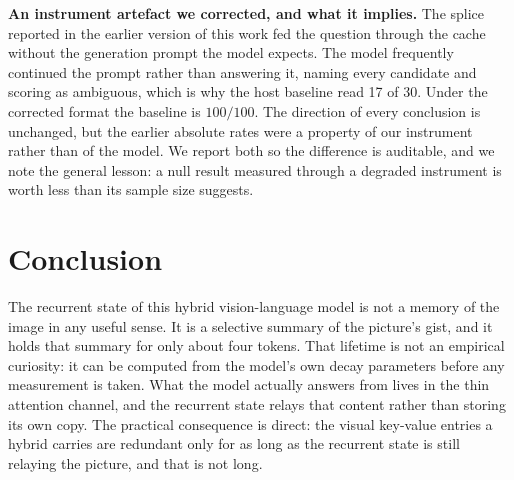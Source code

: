 \documentclass[10pt]{article}
\begin{document}
\textbf{An instrument artefact we corrected, and what it implies.} The splice
reported in the earlier version of this work fed the question through the cache
without the generation prompt the model expects. The model frequently continued
the prompt rather than answering it, naming every candidate and scoring as
ambiguous, which is why the host baseline read 17 of 30. Under the corrected
format the baseline is $100/100$. The direction of every conclusion is
unchanged, but the earlier absolute rates were a property of our instrument
rather than of the model. We report both so the difference is auditable, and we
note the general lesson: a null result measured through a degraded instrument is
worth less than its sample size suggests.

\section{Conclusion}

The recurrent state of this hybrid vision-language model is not a memory of
the image in any useful sense. It is a selective summary of the picture's
gist, and it holds that summary for only about four tokens. That lifetime is
not an empirical curiosity: it can be computed from the model's own decay
parameters before any measurement is taken. What the model actually answers
from lives in the thin attention channel, and the recurrent state relays that
content rather than storing its own copy. The practical consequence is direct:
the visual key-value entries a hybrid carries are redundant only for as long
as the recurrent state is still relaying the picture, and that is not long.
\end{document}
